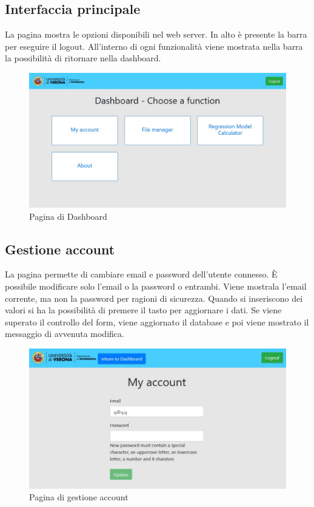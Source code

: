 \newpage
\subsection{Interfaccia principale}
\label{secsub:flask-funzionalità-principale}
La pagina mostra le opzioni disponibili nel web server.
In alto è presente la barra per eseguire il logout.
All'interno di ogni funzionalità viene mostrata nella barra la possibilità di ritornare nella dashboard.

\begin{figure}[htp]
    \centering
    \includegraphics[width=0.85\linewidth]{images/chapter4-flask-daskboard.jpg}
    \caption{Pagina di Dashboard}
\end{figure}

\subsection{Gestione account}
\label{secsub:flask-funzionalità-account}
La pagina permette di cambiare email e password dell'utente connesso.
È possibile modificare solo l'email o la password o entrambi.
Viene mostrala l'email corrente, ma non la password per ragioni di sicurezza.
Quando si inseriscono dei valori si ha la possibilità di premere il tasto per aggiornare i dati.
Se viene superato il controllo del form, viene aggiornato il database e poi viene mostrato il messaggio di avvenuta modifica.
\begin{figure}[htp]
    \centering
    \includegraphics[width=0.85\linewidth]{images/chapter4-flask-myaccount.jpg}
    \caption{Pagina di gestione account}
\end{figure}

